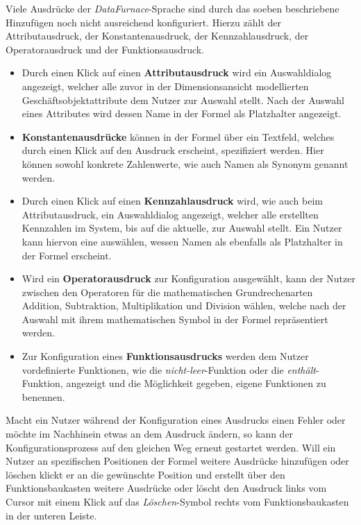 \documentclass[
  language=german, %
  type=bachelor%
]{isthesis}
\begin{document}
\begin{content}
  Viele Ausdrücke der \textit{DataFurnace}-Sprache sind durch das soeben
  beschriebene Hinzufügen noch nicht ausreichend konfiguriert. Hierzu zählt der
  Attributausdruck, der Konstantenausdruck, der Kennzahlausdruck, der
  Operatorausdruck und der Funktionsausdruck. 

  \begin{itemize} 
    \item Durch einen Klick auf einen \textbf{Attributausdruck} wird ein Auswahldialog
      angezeigt, welcher alle zuvor in der Dimensionsansicht modellierten
      Geschäftsobjektattribute dem Nutzer zur Auswahl stellt.  Nach der Auswahl
      eines Attributes wird dessen Name in der Formel als Platzhalter
      angezeigt. 
      
    \item  \textbf{Konstantenausdrücke} können in der Formel über ein
      Textfeld, welches durch einen Klick auf den Ausdruck erscheint,
      spezifiziert werden. Hier können sowohl konkrete Zahlenwerte, wie auch
      Namen als Synonym genannt werden.

    \item Durch einen Klick auf einen \textbf{Kennzahlausdruck} wird, wie
      auch beim Attributausdruck, ein Auswahldialog angezeigt, welcher alle
      erstellten Kennzahlen im System, bis auf die aktuelle, zur Auswahl
      stellt. Ein Nutzer kann hiervon eine auswählen, wessen Namen als
      ebenfalls als Platzhalter in der Formel erscheint.  

    \item Wird ein \textbf{Operatorausdruck} zur Konfiguration ausgewählt,
      kann der Nutzer zwischen den Operatoren für die mathematischen
      Grundrechenarten Addition, Subtraktion, Multiplikation und Division
      wählen, welche nach der Auswahl mit ihrem mathematischen Symbol in der Formel
      repräsentiert werden.

    \item Zur Konfiguration eines \textbf{Funktionsausdrucks} werden dem Nutzer
      vordefinierte Funktionen, wie \zB{} die \textit{nicht-leer}-Funktion oder
      die \textit{enthält}-Funktion, angezeigt und die Möglichkeit gegeben,
      eigene Funktionen zu benennen.
  \end{itemize}

  Macht ein Nutzer während der Konfiguration eines Ausdrucks einen Fehler oder
  möchte im Nachhinein etwas an dem Ausdruck ändern, so kann der
  Konfigurationsprozess auf den gleichen Weg erneut gestartet werden.  Will ein
  Nutzer an spezifischen Positionen der Formel weitere Ausdrücke hinzufügen
  oder löschen klickt er an die gewünschte Position und erstellt über den
  Funktionsbaukasten weitere Ausdrücke oder löscht den Ausdruck links vom Cursor
  mit einem Klick auf das \textit{Löschen}-Symbol rechts vom Funktionsbaukasten
  in der unteren Leiste.



\end{content}
\end{document}
